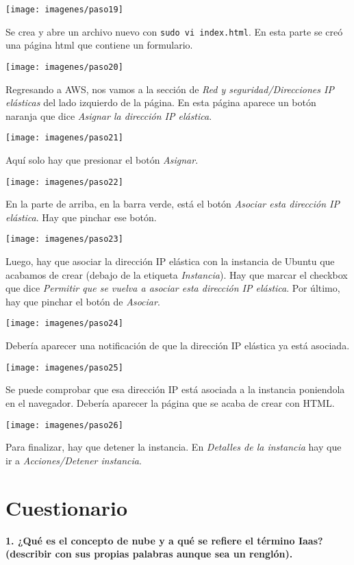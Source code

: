 \documentclass{article}
\begin{document}
\texttt{[image: imagenes/paso19]}

Se crea y abre un archivo nuevo con \texttt{sudo vi index.html}. En esta parte se creó una página html que contiene un formulario.

\texttt{[image: imagenes/paso20]}

Regresando a AWS, nos vamos a la sección de \textit{Red y seguridad/Direcciones IP elásticas} del lado izquierdo de la página. En esta página aparece un botón naranja que dice \textit{Asignar la dirección IP elástica}.

\texttt{[image: imagenes/paso21]}

Aquí solo hay que presionar el botón \textit{Asignar}.

\texttt{[image: imagenes/paso22]}

En la parte de arriba, en la barra verde, está el botón \textit{Asociar esta dirección IP elástica}. Hay que pinchar ese botón.

\texttt{[image: imagenes/paso23]}

Luego, hay que asociar la dirección IP elástica con la instancia de Ubuntu que acabamos de crear (debajo de la etiqueta \textit{Instancia}). Hay que marcar el checkbox que dice \textit{Permitir que se vuelva a asociar esta dirección IP elástica}. Por último, hay que pinchar el botón de \textit{Asociar}.

\texttt{[image: imagenes/paso24]}

Debería aparecer una notificación de que la dirección IP elástica ya está asociada.

\texttt{[image: imagenes/paso25]}

Se puede comprobar que esa dirección IP está asociada a la instancia poniendola en el navegador. Debería aparecer la página que se acaba de crear con HTML.

\texttt{[image: imagenes/paso26]}

Para finalizar, hay que detener la instancia. En \textit{Detalles de la instancia} hay que ir a \textit{Acciones/Detener instancia}.

\section{Cuestionario}

\textbf{1. ¿Qué es el concepto de nube y a qué se refiere el término Iaas? (describir con sus propias palabras aunque sea un renglón).}
\end{document}
